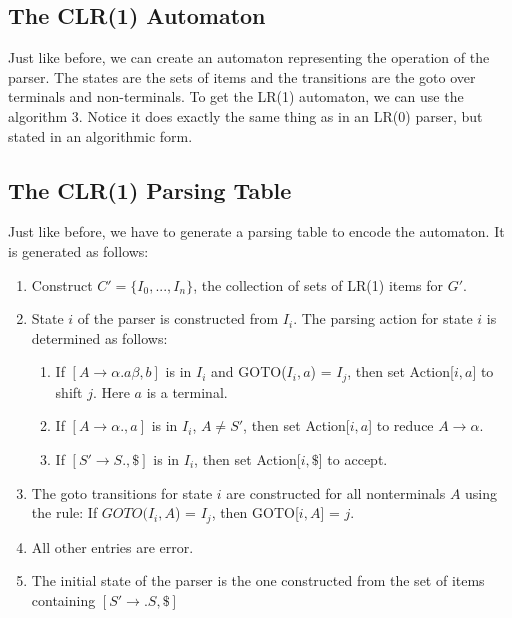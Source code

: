 \documentclass[12pt,letterpaper]{amsbook}
\theoremstyle{definition}
\begin{document}
\subsection{The CLR(1) Automaton}

Just like before, we can create an automaton representing the operation of the parser. The states are the sets of items and the transitions are the goto over terminals and non-terminals. To get the LR(1) automaton, we can use the algorithm 3. Notice it does exactly the same thing as in an LR(0) parser, but stated in an algorithmic form.


\subsection{The CLR(1) Parsing Table}

Just like before, we have to generate a parsing table to encode the automaton. It is generated as follows:

\begin{enumerate}
  \item Construct $C' = \{I_0,...,I_n\}$, the collection of sets of LR(1) items for $G'$.
  \item State $i$ of the parser is constructed from $I_i$. The parsing action for state $i$ is determined as follows:
    \begin{enumerate}
      \item If $[A \rightarrow \alpha . a \beta, b]$ is in $I_i$ and GOTO($I_i,a$) = $I_j$, then set Action[$i,a$] to shift $j$. Here $a$ is a terminal.
      \item If $[A \rightarrow \alpha ., a]$ is in $I_i$, $A \neq S'$, then set Action[$i,a$] to reduce $A \rightarrow \alpha$.
      \item If $[S' \rightarrow S . , \$]$ is in $I_i$, then set Action[$i,\$$] to accept.
    \end{enumerate}
  \item The goto transitions for state $i$ are constructed for all nonterminals $A$ using the rule: If $GOTO(I_i,A$) = $I_j$, then GOTO[$i,A$] = $j$.
  \item All other entries are error.
  \item The initial state of the parser is the one constructed from the set of items containing $[S' \rightarrow .S,\$]$
\end{enumerate}
\end{document}
